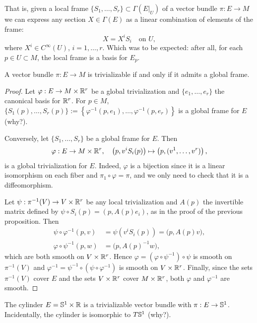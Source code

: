 That is, given a local frame $\{S_1, \ldots, S_r\}\subset\Gamma(E|_U)$ of a vector bundle $\pi: E \to M$ we can express any section $X\in\Gamma(E)$ as a linear combination of elements of the frame:
\begin{equation}
	X = X^i S_i \quad\mbox{on }U,
\end{equation}
where $X^i\in C^\infty(U)$, $i=1,\ldots,r$.
Which was to be expected: after all, for each $p\in U\subset M$, the local frame is a basis for $E_p$.

\begin{proposition}\label{prop:trivializable}
	A vector bundle $\pi: E\to M$ is trivializable if and only if it admits a global frame.
\end{proposition}
\begin{proof}
	Let $\varphi: E \to M\times\mathbb{R}^r$ be a global trivialization and $\{e_1, \ldots, e_r\}$ the canonical basis for $\mathbb{R}^r$.
	For $p\in M$, $\{S_1(p), \ldots, S_r(p)\} := \left\{\varphi^{-1}(p, e_1), \ldots, \varphi^{-1}(p, e_r) \right\}$ is a global frame for $E$ (why?).

	Conversely, let $\{S_1, \ldots, S_r\}$ be a global frame for $E$. Then
	\begin{equation}
		\varphi: E \to M\times\mathbb{R}^r, \quad
		\left(p, v^i S_i(p)\right) \mapsto \left(p, (v^1, \ldots, v^r)\right),
	\end{equation}
	is a global trivialization for $E$.
	Indeed, $\varphi$ is a bijection since it is a linear isomorphism on each fiber and $\pi_1\circ\varphi = \pi$, and we only need to check that it is a diffeomorphism.

	Let $\psi:\pi^{-1}(V)\to V\times\mathbb{R}^r$ be any local trivialization and $A(p)$ the invertible matrix defined by $\psi\circ S_i(p) = (p, A(p)e_i)$, as in the proof of the previous proposition.
	Then
	\begin{align}
		\psi\circ\varphi^{-1}(p,v) &= \psi\left(v^iS_i(p)\right) = \big(p, A(p)v\big), \\
		\varphi\circ\psi^{-1}(p,w) &= \big(p, A(p)^{-1}w\big),
	\end{align}
	which are both smooth on $V\times\mathbb{R}^r$.
	Hence $\varphi = (\varphi\circ\psi^{-1})\circ\psi$ is smooth on $\pi^{-1}(V)$ and $\varphi^{-1} = \psi^{-1}\circ(\psi\circ\varphi^{-1})$ is smooth on $V\times\mathbb{R}^r$.
	Finally, since the sets $\pi^{-1}(V)$ cover $E$ and the sets $V\times\mathbb{R}^r$ cover $M\times\mathbb{R}^r$, both $\varphi$ and $\varphi^{-1}$ are smooth.
\end{proof}

\begin{example}
	The cylinder $E = \mathbb{S}^1\times\mathbb{R}$ is a trivializable vector bundle with $\pi:E\to \mathbb{S}^1$.
	Incidentally, the cylinder is isomorphic to $T\mathbb{S}^1$ (why?).
\end{example}

